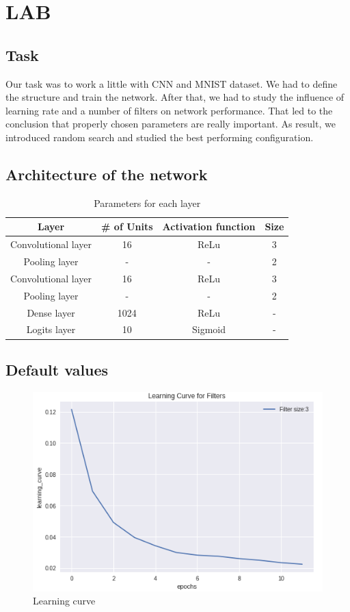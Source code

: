\documentclass{scrartcl}
\begin{document}
\section*{LAB}
\subsection*{Task}
Our task was to work a little with CNN and MNIST dataset. We had to define the structure and train the network. After that, we had to study the influence of learning rate and a number of filters on network performance. That led to the conclusion that properly chosen parameters are really important. As result, we introduced random search and studied the best performing configuration. 

\subsection*{Architecture of the network}

\begin{table}[h]
	\centering
\begin{tabular}{|c||c|c||c|}
	\hline
	\textbf{Layer} & \textbf{\# of Units} & \textbf{Activation function} & \textbf{Size} \\ \hline \hline
	Convolutional layer & 16 & ReLu & 3 \\ \hline
	Pooling layer & -  & -  & 2 \\ \hline
	Convolutional layer & 16  & ReLu & 3 \\ \hline
	Pooling layer & -  & - & 2 \\ \hline
	Dense layer & 1024  & ReLu & -  \\ \hline
	Logits layer & 10  & Sigmoid  & - \\ \hline
\end{tabular}
\caption{Parameters for each layer}
\end{table}

\subsection*{Default values}

\begin{figure}[H]
	\centering
	\includegraphics[scale=0.6]{1}
	\caption{Learning curve}
	\label{fig:1}
\end{figure}
\end{document}
